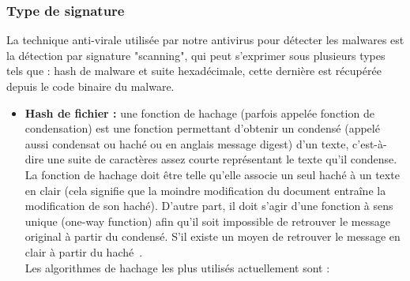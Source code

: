 \subsubsection{Type de signature }
La technique anti-virale utilisée par notre antivirus pour détecter les malwares est la détection par signature "scanning", qui peut s'exprimer sous plusieurs types tels que : hash de malware et suite hexadécimale, cette  dernière est récupérée depuis le code  binaire du malware.
\begin{itemize}
\item \textbf{Hash de fichier : }une fonction de hachage (parfois appelée fonction de condensation) est une fonction permettant d'obtenir un condensé (appelé aussi condensat ou haché ou en anglais message digest) d'un texte, c'est-à-dire une suite de caractères assez courte représentant le texte qu'il condense. La fonction de hachage doit être telle qu'elle associe un seul haché à un texte en clair (cela signifie que la moindre modification du document entraîne la modification de son haché). D'autre part, il doit s'agir d'une fonction à sens unique (one-way function) afin qu'il soit impossible de retrouver le message original à partir du condensé. S'il existe un moyen de retrouver le message en clair à partir du haché~\cite{hashage}.\\

Les algorithmes de hachage les plus utilisés actuellement sont :\\


\end{itemize}
